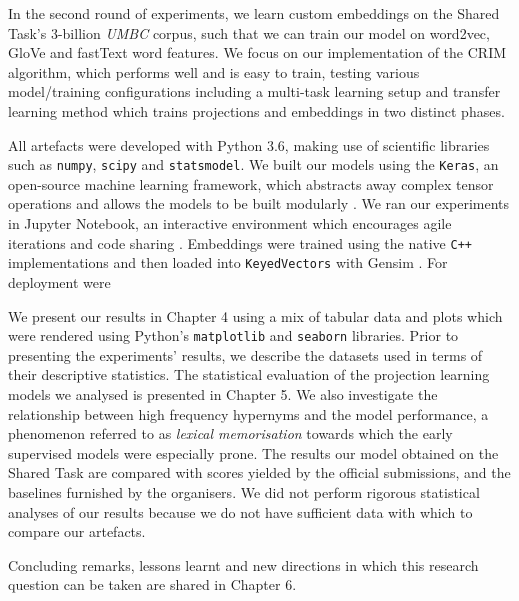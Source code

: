 In the second round of experiments, we learn custom embeddings on the Shared Task's 3-billion \textit{UMBC} corpus, such that we can train our model on word2vec, GloVe and fastText word features.  We focus on our implementation of the CRIM algorithm, which performs well and is easy to train, testing various model/training configurations including a multi-task learning setup and transfer learning method which trains projections and embeddings in two distinct phases.

All artefacts were developed with Python 3.6, making use of scientific libraries such as \texttt{numpy}, \texttt{scipy} and \texttt{statsmodel}.  We built our models using the \texttt{Keras}, an open-source machine learning framework, which abstracts away complex tensor operations and allows the models to be built modularly \citep{chollet2015keras}.  We ran our experiments in Jupyter Notebook, an interactive environment which encourages agile iterations and code sharing \citep{kluyver2016jupyter}.  Embeddings were trained using the native \texttt{C++} implementations and then loaded into \texttt{KeyedVectors} with Gensim \citep{rehurek_lrec}.  For deployment were 

We present our results in Chapter 4 using a mix of tabular data and plots which were rendered using Python's \texttt{matplotlib} and \texttt{seaborn} libraries.  Prior to presenting the experiments' results, we describe the datasets used in terms of their descriptive statistics.  The statistical evaluation of the projection learning models we analysed is presented in Chapter 5.  We also investigate the relationship between high frequency hypernyms and the model performance, a phenomenon referred to as \textit{lexical memorisation} \citep{levy2015supervised} towards which the early supervised models were especially prone.  The results our model obtained on the Shared Task are compared with scores yielded by the official submissions, and the baselines furnished by the organisers.  We did not perform  rigorous statistical analyses of our results because we do not have sufficient data with which to compare our artefacts.

Concluding remarks, lessons learnt and new directions in which this research question can be taken are shared in Chapter 6.
